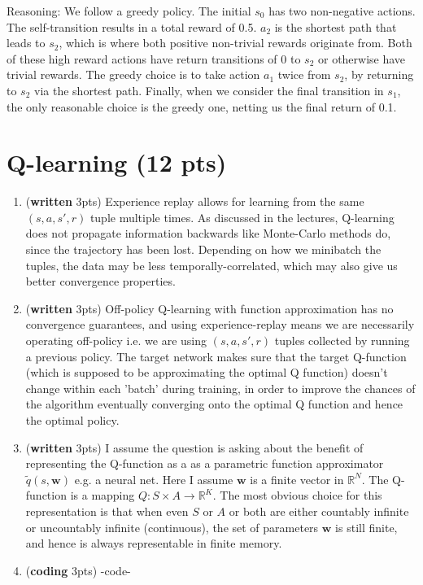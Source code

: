 \documentclass{article}
\begin{document}
\begin{enumerate}
Reasoning: We follow a greedy policy. The initial $s_0$ has two non-negative actions. The self-transition results in a total reward of 0.5. $a_2$ is the shortest path that leads to $s_2$, which is where both positive non-trivial rewards originate from. Both of these high reward actions have return transitions of 0 to $s_2$ or otherwise have trivial rewards. The greedy choice is to take action $a_1$ twice from $s_2$, by returning to $s_2$ via the shortest path. Finally, when we consider the final transition in $s_1$, the only reasonable choice is the greedy one, netting us the final return of 0.1.

\end{enumerate}


\section{Q-learning (12 pts)}\label{q-learn}

\begin{enumerate}
\item (\textbf{written} 3pts) Experience replay allows for learning from the same $(s,a,s',r)$ tuple multiple times. As discussed in the lectures, Q-learning does not propagate information backwards like Monte-Carlo methods do, since the trajectory has been lost. Depending on how we minibatch the tuples, the data may be less temporally-correlated, which may also give us better convergence properties.

\item (\textbf{written} 3pts) Off-policy Q-learning with function approximation has no convergence guarantees, and using experience-replay means we are necessarily operating off-policy i.e. we are using $(s,a,s',r)$ tuples collected by running a previous policy. The target network makes sure that the target Q-function (which is supposed to be approximating the optimal Q function) doesn't change within each 'batch' during training, in order to improve the chances of the algorithm eventually converging onto the optimal Q function and hence the optimal policy.

\item (\textbf{written} 3pts) I assume the question is asking about the benefit of representing the Q-function as a as a parametric function approximator $\tilde{q}(s, \mathbf{w})$ e.g. a neural net. Here I assume $\textbf{w}$ is a finite vector in $\mathbb{R}^N$. The Q-function is a mapping $Q: S \times A \rightarrow \mathbb{R}^K$. The most obvious choice for this representation is that when even $S$ or $A$ or both are either countably infinite or uncountably infinite (continuous), the set of parameters $\textbf{w}$ is still finite, and hence is always representable in finite memory.

\item (\textbf{coding} 3pts) -code-
\end{enumerate}
\end{document}
